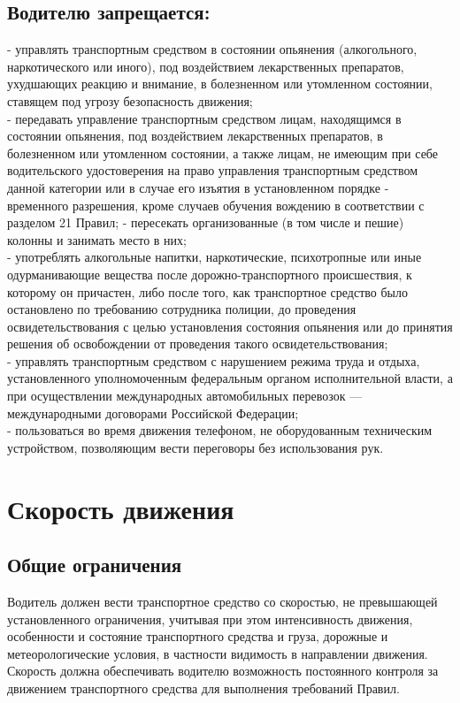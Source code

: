\documentclass[russian,english,12pt,a4paper,reqno,dviphfm,oneside]{book}
\begin{document}
{\section[Водителю запрещается]{Водителю запрещается:}
\noindent- управлять транспортным средством в состоянии опьянения (алкогольного, наркотического или иного), под воздействием лекарственных препаратов, ухудшающих реакцию и внимание, в болезненном или утомленном состоянии, ставящем под угрозу безопасность движения;\\
- передавать управление транспортным средством лицам, находящимся в состоянии опьянения, под воздействием лекарственных препаратов, в болезненном или утомленном состоянии, а также лицам, не имеющим при себе водительского удостоверения на право управления транспортным средством данной категории или в случае его изъятия в установленном порядке - временного разрешения, кроме случаев обучения вождению в соответствии с разделом 21 Правил;
- пересекать организованные (в том числе и пешие) колонны и занимать место в них;\\
- употреблять алкогольные напитки, наркотические, психотропные или иные одурманивающие вещества после дорожно-транспортного происшествия, к которому он причастен, либо после того, как транспортное средство было остановлено по требованию сотрудника полиции, до проведения освидетельствования с целью установления состояния опьянения или до принятия решения об освобождении от проведения такого освидетельствования;\\
- управлять транспортным средством с нарушением режима труда и отдыха, установленного уполномоченным федеральным органом исполнительной власти, а при осуществлении международных автомобильных перевозок — международными договорами Российской Федерации;\\
- пользоваться во время движения телефоном, не оборудованным техническим устройством, позволяющим вести переговоры без использования рук.

\chapter{Скорость движения}

\section{Общие ограничения} Водитель должен вести транспортное средство со скоростью, не превышающей установленного ограничения, учитывая при этом интенсивность движения, особенности и состояние транспортного средства и груза, дорожные и метеорологические условия, в частности видимость в направлении движения. Скорость должна обеспечивать водителю возможность постоянного контроля за движением транспортного средства для выполнения требований Правил.

}
\end{document}
